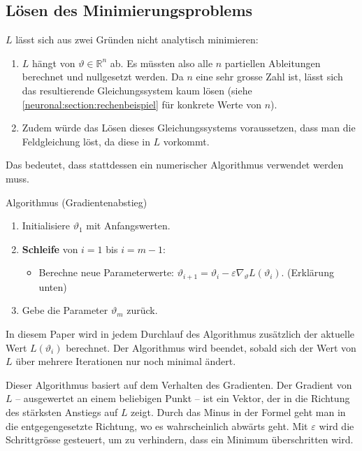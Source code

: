\subsection{Lösen des Minimierungsproblems}\label{neuronal:subsection:lösen_optimierungsproblem}
\( L \) lässt sich aus zwei Gründen nicht analytisch minimieren:
\begin{enumerate}
    \item \( L \) hängt von \( \vartheta \in \mathbb{R}^n \) ab. 
    Es müssten also alle \( n \) partiellen Ableitungen berechnet und nullgesetzt werden. 
    Da \( n \) eine sehr grosse Zahl ist, lässt sich das resultierende Gleichungssystem kaum lösen (siehe \ref{neuronal:section:rechenbeispiel} für konkrete Werte von $n$).
    \item Zudem würde das Lösen dieses Gleichungssystems voraussetzen, dass man die Feldgleichung löst, da diese in $L$ vorkommt.
\end{enumerate}
Das bedeutet, dass stattdessen ein numerischer Algorithmus verwendet werden muss.

\begin{aufgabe}
    Algorithmus (Gradientenabstieg)
    \begin{enumerate}
        \item Initialisiere \( \vartheta_1 \) mit Anfangswerten.
        \item \textbf{Schleife} von \( i = 1 \) bis \( i = m - 1 \):
        \begin{itemize}
            \item Berechne neue Parameterwerte: \( \vartheta_{i+1} = \vartheta_i - \varepsilon \nabla_\vartheta L\left(\vartheta_i\right) \). (Erklärung unten)
        \end{itemize}
        \item Gebe die Parameter \( \vartheta_m \) zurück.
    \end{enumerate}
    \label{neuronal:gradient_descent}
\end{aufgabe}

In diesem Paper wird in jedem Durchlauf des Algorithmus zusätzlich der aktuelle Wert \( L(\vartheta_i) \) berechnet.
Der Algorithmus wird beendet, sobald sich der Wert von \( L \) über mehrere Iterationen nur noch minimal ändert.

Dieser Algorithmus basiert auf dem Verhalten des Gradienten.
Der Gradient von $L$ -- ausgewertet an einem beliebigen Punkt -- ist ein Vektor, der in die Richtung des stärksten Anstiegs auf $L$ zeigt.
Durch das Minus in der Formel geht man in die entgegengesetzte Richtung, wo es wahrscheinlich abwärts geht.
Mit $\varepsilon$ wird die Schrittgrösse gesteuert, um zu verhindern, dass ein Minimum überschritten wird.

